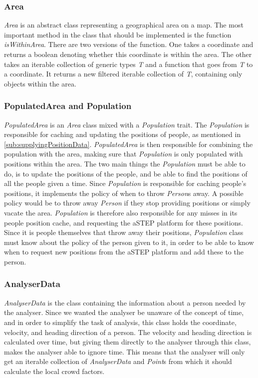 \subsubsection{Area}
\emph{Area} is an abstract class representing a geographical area on a map. The most important method in the class that should be implemented is the function \emph{isWithinArea}. There are two versions of the function. One takes a coordinate and returns a boolean denoting whether this coordinate is within the area. The other takes an iterable collection of generic types \emph{T} and a function that goes from \emph{T} to a coordinate. It returns a new filtered iterable collection of \emph{T}, containing only objects within the area.

\subsubsection{PopulatedArea and Population}
\emph{PopulatedArea} is an \emph{Area} class mixed with a \emph{Population} trait. The \emph{Population} is responsible for caching and updating the positions of people, as mentioned in \cref{sub:supplyingPositionData}. \emph{PopulatedArea} is then responsible for combining the population with the area, making sure that \emph{Population} is only populated with positions within the area. The two main things the \emph{Population} must be able to do, is to update the positions of the people, and be able to find the positions of all the people given a time. Since \emph{Population} is responsible for caching people's positions, it implements the policy of when to throw \emph{Person}s away. A possible policy would be to throw away \emph{Person} if they stop providing positions or simply vacate the area. \emph{Population} is therefore also responsible for any misses in its people position cache, and requesting the aSTEP platform for these positions. Since it is people themselves that throw away their positions, \emph{Population} class must know about the policy of the person given to it, in order to be able to know when to request new positions from the aSTEP platform and add these to the person.

\subsubsection{AnalyserData}
\emph{AnalyserData} is the class containing the information about a person needed by the analyser. Since we wanted the analyser be unaware of the concept of time, and in order to simplify the task of analysis, this class holds the coordinate, velocity, and heading direction of a person. The velocity and heading direction is calculated over time, but giving them directly to the analyser through this class, makes the analyser able to ignore time. This means that the analyser will only get an iterable collection of \emph{AnalyserData} and \emph{Point}s from which it should calculate the local crowd factors. 

